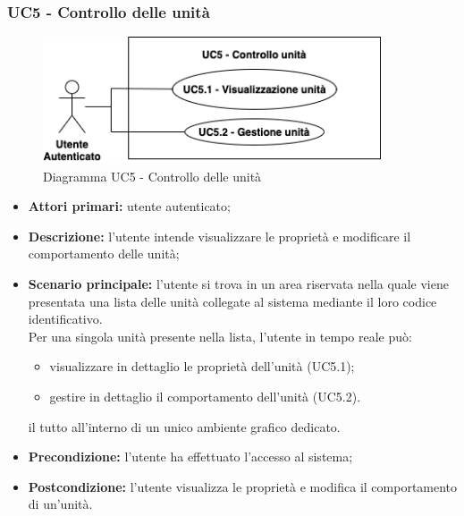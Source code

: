 \subsubsection{UC5 - Controllo delle unità}
\begin{figure}[h!]
    \centering
    \includegraphics[width=10cm]{images/uc5.png}
    \caption{Diagramma UC5 - Controllo delle unità}
\end{figure}
\begin{itemize}
    \item \textbf{Attori primari:} utente autenticato;
    \item \textbf{Descrizione:} l'utente intende visualizzare le proprietà e modificare il comportamento delle unità;
    \item \textbf{Scenario principale:} l'utente si trova in un area riservata nella quale viene presentata una lista delle unità collegate al sistema mediante il loro codice identificativo.\\
    Per una singola unità presente nella lista, l'utente in tempo reale può:
    \begin{itemize}
        \item visualizzare in dettaglio le proprietà dell'unità (UC5.1);
        \item gestire in dettaglio il comportamento dell'unità (UC5.2).
    \end{itemize}
    il tutto all'interno di un unico ambiente grafico dedicato.
    \item \textbf{Precondizione:} l'utente ha effettuato l'accesso al sistema;
    \item \textbf{Postcondizione:} l'utente visualizza le proprietà e modifica il comportamento di un'unità.
\end{itemize}
\newpage
